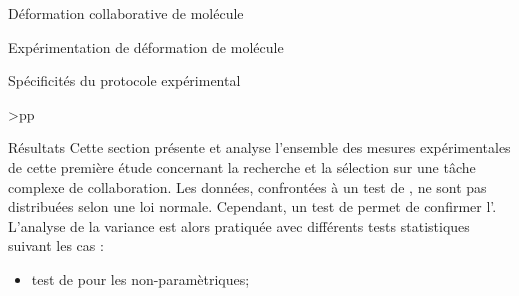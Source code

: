 \documentclass[myfrancais]{mythesis}
\begin{document}
\begin{mychapter}{Déformation collaborative de molécule}
\begin{mysection}{Expérimentation de déformation de molécule}
\begin{mysubsection}{Spécificités du protocole expérimental}
\begin{mytable}
\begin{mytabular}{>{\bfseries}p{\exptwofirstcolumn}p{\exptwosecondcolumn}}
						\mymiddlerule[\heavyrulewidth]
						 \\
						\mybottomrule
					\end{mytabular}
				\end{mytable}
			\end{mysubsection}
		\end{mysection}
		\begin{mysection}{Résultats}
			Cette section présente et analyse l'ensemble des mesures expérimentales de cette première étude concernant la recherche et la sélection sur une tâche complexe de collaboration.
			Les données, confrontées à un test de , ne sont pas distribuées selon une loi normale.
			Cependant, un test de  permet de confirmer l'.
			L'analyse de la variance est alors pratiquée avec différents tests statistiques suivant les cas :
			\begin{itemize}
				\item test de  pour les  non-paramètriques;

\end{itemize}
\end{mysection}
\end{mychapter}
\end{document}

